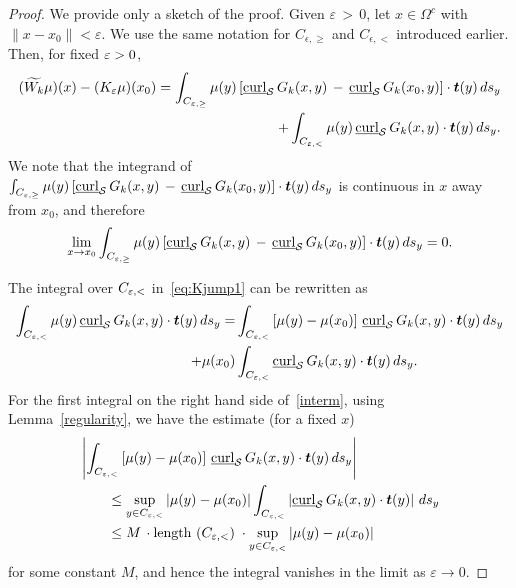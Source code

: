 \begin{proof}
We provide only a sketch of the proof.  Given $\varepsilon \, > \,0$,
let $x\in \Omega^{c}$ with $ \| x-x_0\|<\varepsilon$.   We use the same
notation for $C_{\epsilon,\geq}$ and $C_{\epsilon,<}$ introduced
earlier.  Then, for fixed $\varepsilon>0$, 
\begin{align}
  (\widetilde{W_k}\mu)(x)-(K_{\varepsilon} \mu)(x_0) = 
  \int_{C_{\e,\geq}}\mu(y)\left[\underline{\mbox{curl}}_{\S}\, 
  G_{k}(x,y)\,-\,\underline{\mbox{curl}}_{\S}\,G_k(x_{0},y)
  \right]\cdot\vec{t}(y)\, ds_{y} \nonumber\\
  +\int_{C_{\e,<}} \mu(y)\,\underline{\mbox{curl}}_{\S}\,
  G_k(x,y)\cdot\vec{t}(y)\,ds_{y}.
  \label{eq:Kjump1}
\end{align}
We note that the integrand of $\int_{C_{\e,\geq}} \mu(y)
\left[\underline{\mbox{curl}}_{\S}\,
G_k(x,y)\,-\,\underline{\mbox{curl}}_{\S}\,G_k(x_0,y)\right]\cdot\vec{t}(y)\,
ds_{y}$ is continuous in $x$ away from  $x_0$, and therefore 
\begin{align*}
  \lim_{x\rightarrow x_0}  \int_{C_{\e,\geq}}
  \mu(y)\left[\underline{\mbox{curl}}_{\S}\,
  G_{k}(x,y)\,-\,\underline{\mbox{curl}}_{\S}\,
  G_{k}(x_{0},y)\right]\cdot\vec{t}(y)\,ds_{y} = 0.
\end{align*}

The integral over $C_{\varepsilon,<}$ in~\eqref{eq:Kjump1} can be rewritten as
\begin{align}
  \int_{C_{\e,<}} \mu(y)\,\underline{\mbox{curl}}_{\S}\,
    G_k(x,y)\cdot\vec{t}(y)\,ds_{y} 
  = &\int_{C_{\e,<}} \left[\mu(y)-\mu(x_0)\right]\,
    \underline{\mbox{curl}}_{\S}\,G_k(x,y)\cdot\vec{t}(y)\,ds_{y}
    \nonumber \\
  + \mu(x_0)&\int_{C_{\e,<}} \underline{\mbox{curl}}_{\S}\,
    G_k(x,y)\cdot\vec{t}(y)\,ds_{y}.
  \label{interm}
\end{align}
For the first integral on the right hand side of~\eqref{interm}, using
Lemma~\ref{regularity}, we have the estimate (for a fixed $x$)
\begin{align*}
  &\left|\int_{C_{\e,<}} \left[\mu(y)-\mu(x_0)\right]\,
  \underline{\mbox{curl}}_{\S}\,G_k(x,y)\cdot\vec{t}(y)
  \,ds_{y}\right| \\
  &\qquad \leq \sup_{y \in C_{\e,<}} |\mu(y)-\mu(x_0)|
  \int_{C_{\e,<}} \left|\underline{\mbox{curl}}_{\S}\,
  G_k(x,y)\cdot\vec{t}(y)\right|\,ds_{y}\\
  &\qquad \leq M\,\cdot \mbox{length $(C_{\e,<})$}\;
  \cdot \sup_{y \in C_{\e,<}} |\mu(y)-\mu(x_0)|
\end{align*}
for some constant $M$, and hence the integral vanishes in the limit as
$\varepsilon\longrightarrow 0$.


\end{proof}
